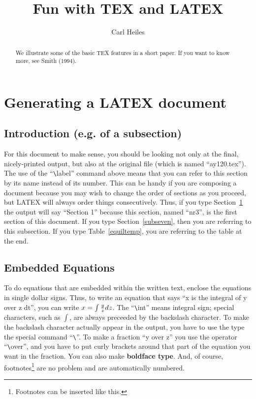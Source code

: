

\title{Fun with TEX and LATEX}

\author{Carl Heiles}


\begin{abstract}

	We illustrate some of the basic TEX features in a short paper.
If you want to know more, see Smith (1994).
\end{abstract}

\section{Generating a LATEX document} \label{nr3}

\subsection{Introduction (e.g. of a subsection) \label{subseven}}

	For this document to make sense, you should be looking not only
at the final, nicely-printed output, but also at the original file
(which is named ``ay120.tex'').  The use of the ``\verb"\"label''
command above means that you can refer to this section by its name
instead of its number.  This can be handy if you are composing a
document because you may wish to change the order of sections as you
proceed, but LATEX will always order things consecutively.  Thus, if you
type Section~\ref{nr3} the output will say ``Section 1'' because this
section, named ``nr3'', is the first section of this document.  If you
type Section~\ref{subseven}, then you are referring to this subsection.
If you type Table~\ref{equiltemp}, you are referring to the table at the
end.

\subsection{Embedded Equations}
	To do equations that are embedded within the written text,
enclose the equations in single dollar signs.  Thus, to write an
equation that says ``x is the integral of y over z dt'', you can write
$x = \int {y \over z} dz$.  The ``\verb"\"int'' means integral sign;
special characters, such as $\int$, are always preceeded by the
backslash character.  To make the backslash character actually appear in
the output, you have to use the type the special command ``\verb"\"''.
To make a fraction ``y over z'' you use the operator ``\verb"\"over'',
and you have to put curly brackets around that part of the equation you
want in the fraction.  You can also make {\bf boldface type}.  And, of
course, footnotes\footnote{Footnotes can be inserted like this.} are no
problem and are automatically numbered.

